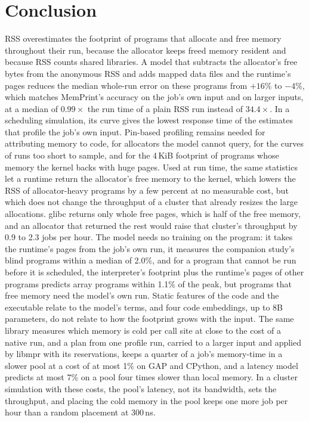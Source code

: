 \documentclass[11pt]{article}
\newcommand{\memprint}{MemPrint}
\begin{document}
\section{Conclusion}
\label{sec:conclusion}

RSS overestimates the footprint of programs that allocate and free memory throughout their run, because the allocator
keeps freed memory resident and because RSS counts shared libraries. A model that subtracts the allocator's free bytes
from the anonymous RSS and adds mapped data files and the runtime's pages reduces the median whole-run error on these
programs from $+16\%$ to $-4\%$, which matches \memprint{}'s accuracy on the job's own input and on larger inputs, at a
median of $0.99\times$ the run time of a plain RSS run instead of $34.4\times$. In a scheduling simulation, its curve
gives the lowest response time of the estimates that profile the job's own input. Pin-based profiling remains needed
for attributing memory to code, for allocators the model cannot query, for the curves of runs too short to sample, and
for the 4\,KiB footprint of programs whose memory the kernel backs with huge pages. Used at run time, the same
statistics let a runtime return the allocator's free memory to the kernel, which lowers the RSS of allocator-heavy
programs by a few percent at no measurable cost, but which does not change the throughput of a cluster that already
resizes the large allocations. glibc returns only whole free pages, which is half of the free memory, and an allocator
that returned the rest would raise that cluster's throughput by 0.9 to 2.3 jobs per hour. The model needs no training on the program: it takes the runtime's pages from the job's own run, it measures the
companion study's blind programs within a median of 2.0\%, and for a program that cannot be run before it is
scheduled, the interpreter's footprint plus the runtime's pages of other programs predicts array programs within
1.1\% of the peak, but programs that free memory need the model's own run. Static features of the code and the
executable relate to the model's terms, and four code embeddings, up to 8B parameters, do not relate to how the
footprint grows with the input. The same library measures which memory is cold per call site at close to the cost of
a native run, and a plan from one profile run, carried to a larger input and applied by libmpr with its reservations,
keeps a quarter of a job's memory-time in a slower pool at a cost of at most 1\% on GAP and CPython, and a latency
model predicts at most 7\% on a pool four times slower than local memory. In a cluster simulation with these costs,
the pool's latency, not its bandwidth, sets the throughput, and placing the cold memory in the pool keeps one more
job per hour than a random placement at 300\,ns.
\end{document}
